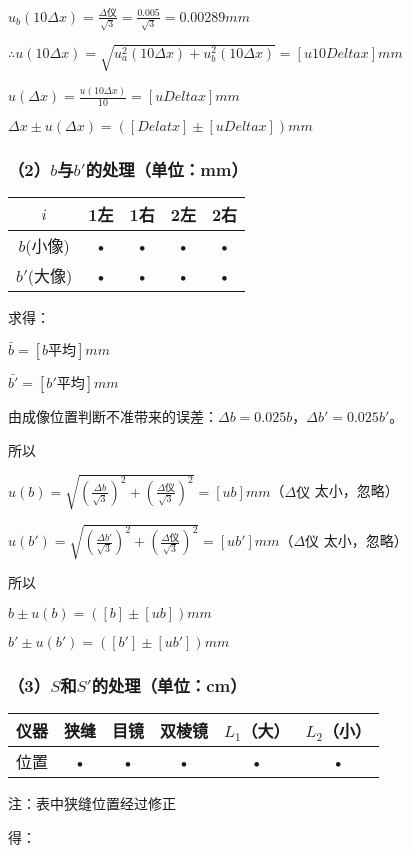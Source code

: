 \documentclass[11pt,a4paper,oneside]{article}
\begin{document}
$u_b(10\Delta x) = \displaystyle\frac{\Delta 仪}{\sqrt{3}} = \displaystyle\frac{0.005}{\sqrt{3}} = 0.00289mm$

$\therefore u(10\Delta x) = \sqrt{u_a^2(10\Delta x)+u_b^2(10\Delta x)} = [u10Delta x]mm$

$u(\Delta x) = \displaystyle\frac{u(10\Delta x)}{10} = [uDelta x]mm$

$\Delta x \pm u(\Delta x) = ([Delat x]\pm [uDelta x])mm$

\subsubsection{（2）$b$与$b'$的处理（单位：mm）}

\begin{tabular}{|c|c|c|c|c|}
\hline 
$i$ & 1左 & 1右 & 2左 & 2右 \\ 
\hline 
$b$(小像) & • & • & • & • \\ 
\hline 
$b'$(大像) & • & • & • & • \\ 
\hline 
\end{tabular} 
求得：

$\bar{b} = [b平均]mm$

$\bar{b'} = [b'平均]mm$

由成像位置判断不准带来的误差：$\Delta b = 0.025b$，$\Delta b' = 0.025b'$。

所以

$u(b) = \sqrt{(\displaystyle\frac{\Delta b}{\sqrt{3}})^2+(\displaystyle\frac{\Delta 仪}{\sqrt{3}})^2} = [ub]mm$（$\Delta 仪$ 太小，忽略）

$u(b') = \sqrt{(\displaystyle\frac{\Delta b'}{\sqrt{3}})^2+(\displaystyle\frac{\Delta 仪}{\sqrt{3}})^2} = [ub']mm$（$\Delta 仪$ 太小，忽略）

所以

$b \pm u(b) = ([b]\pm [ub])mm$

$b' \pm u(b') = ([b']\pm [ub'])mm$

\subsubsection{（3）$S$和$S'$的处理（单位：cm）}
\begin{tabular}{|c|c|c|c|c|c|}
\hline 
仪器 & 狭缝 & 目镜 & 双棱镜 & $L_1$（大） & $L_2$（小） \\ 
\hline 
位置 & • & • & • & • & • \\ 
\hline 
\end{tabular} 
注：表中狭缝位置经过修正

得：
\end{document}
